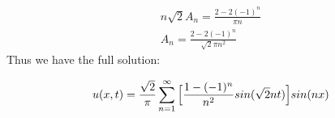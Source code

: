 \documentclass{article}
\begin{document}
\begin{equation}
\begin{aligned}
n\sqrt{2}A_n  = \frac{2- 2(-1)^n}{\pi n}\\
A_n = \frac{2- 2(-1)^n}{\sqrt{2}\pi n^2}
\end{aligned}
\end{equation}
Thus we have the full solution:
\begin{tcolorbox}[minipage,colback=white,arc=0pt,outer arc=0pt]
\begin{equation}
\begin{aligned}
u(x,t) = \frac{\sqrt{2}}\pi\sum^{\infty}_{n=1}\Big{[}\frac{1-(-1)^n}{n^2}sin(\sqrt{2}nt)\Big{]}sin(nx)\\
\end{aligned}
\end{equation}
\end{tcolorbox}
\end{document}
